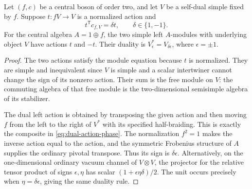 \begin{lemma}\label{lem:fixed-rotation}
Let $(f,c)$ be a central boson of order two, and let $V$ be a self-dual
simple fixed by $f$. Suppose $t:fV\to V$ is a normalized action and
\begin{equation}\label{eq:dual-action-phase}
 t^{\mathsf T}c_{f,V}=\delta t,\qquad \delta\in\{1,-1\}.
\end{equation}
For the central algebra $A=1\oplus f$, the two simple left $A$-modules
with underlying object $V$ have actions $t$ and $-t$. Their duality is
$V_\epsilon^*=V_{\delta\epsilon}$, where $\epsilon=\pm1$.
\end{lemma}
\begin{proof}
The two actions satisfy the module equation because $t$ is normalized.
They are simple and inequivalent since $V$ is simple and a scalar
intertwiner cannot change the sign of its nonzero action.
Their sum is the free module on $V$: the commuting algebra of that free
module is the two-dimensional semisimple algebra of its stabilizer.

The dual left action is obtained by transposing the given action and
then moving $f$ from the left to the right of $V^*$ with its specified
half-braiding. This is exactly the composite in
\eqref{eq:dual-action-phase}. The normalization $f^2=1$ makes the inverse
action equal to the action, and the symmetric Frobenius structure of
$A$ supplies the ordinary pivotal transpose. Thus its sign is
$\delta\epsilon$. Alternatively, on the one-dimensional ordinary
vacuum channel of $V\otimes V$, the projector for the relative tensor
product of signs $\epsilon,\eta$ has scalar
$(1+\epsilon\eta\delta)/2$. The unit occurs precisely when
$\eta=\delta\epsilon$, giving the same duality rule.
\end{proof}

